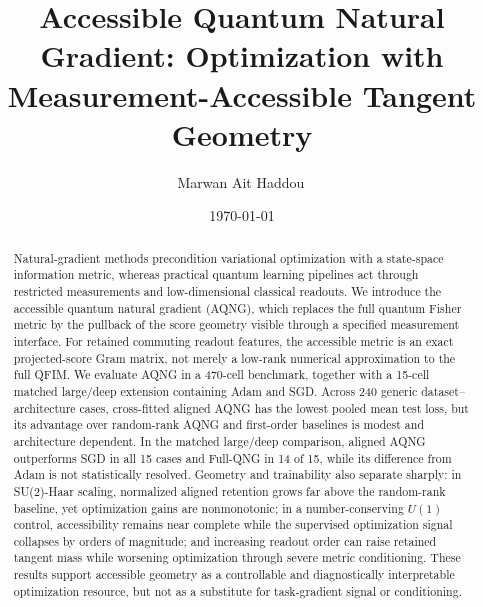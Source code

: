\documentclass[aps,pra,reprint,superscriptaddress,nofootinbib,floatfix]{revtex4-2}
\begin{document}
\title{Accessible Quantum Natural Gradient: Optimization with Measurement-Accessible Tangent Geometry}
\author{Marwan Ait Haddou\,}
\date{\today}

\begin{abstract}
Natural-gradient methods precondition variational optimization with a state-space information metric, whereas practical quantum learning pipelines act through restricted measurements and low-dimensional classical readouts. We introduce the accessible quantum natural gradient (AQNG), which replaces the full quantum Fisher metric by the pullback of the score geometry visible through a specified measurement interface. For retained commuting readout features, the accessible metric is an exact projected-score Gram matrix, not merely a low-rank numerical approximation to the full QFIM. We evaluate AQNG in a 470-cell benchmark, together with a 15-cell matched large/deep extension containing Adam and SGD. Across 240 generic dataset--architecture cases, cross-fitted aligned AQNG has the lowest pooled mean test loss, but its advantage over random-rank AQNG and first-order baselines is modest and architecture dependent. In the matched large/deep comparison, aligned AQNG outperforms SGD in all 15 cases and Full-QNG in 14 of 15, while its difference from Adam is not statistically resolved. Geometry and trainability also separate sharply: in SU(2)-Haar scaling, normalized aligned retention grows far above the random-rank baseline, yet optimization gains are nonmonotonic; in a number-conserving $U(1)$ control, accessibility remains near complete while the supervised optimization signal collapses by orders of magnitude; and increasing readout order can raise retained tangent mass while worsening optimization through severe metric conditioning. These results support accessible geometry as a controllable and diagnostically interpretable optimization resource, but not as a substitute for task-gradient signal or conditioning.
\end{abstract}

\maketitle









\appendix





\end{document}
